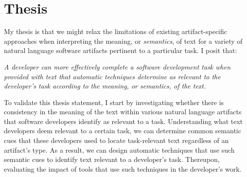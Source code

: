 

\section{Thesis}
\label{cp1:thesis}



My thesis is that we might relax the limitations of existing
artifact-specific approaches when  
interpreting the meaning, or \textit{semantics}, of text 
for a variety of natural language software artifacts pertinent to a particular task.
I posit that:



\medskip
\begin{bluequote}
    \textit{
        A developer can more effectively complete a software development task when provided
        with text that automatic techniques determine as relevant to the developer's task
        according to the meaning, or semantics, of the text.
    }
\end{bluequote}



\smallskip
To validate this thesis statement, I start by investigating whether there is consistency in
 the meaning of the text within various natural language artifacts that software developers
  identify as relevant to a task.
Understanding what text developers deem relevant to a certain task, we can determine
 common semantic cues that these developers used to locate task-relevant text regardless of an artifact's type. 
As a result, we can design automatic techniques that use such semantic cues to identify
 text relevant to a developer's task.
Thereupon, evaluating the impact of tools that use such techniques in the developer's work.
